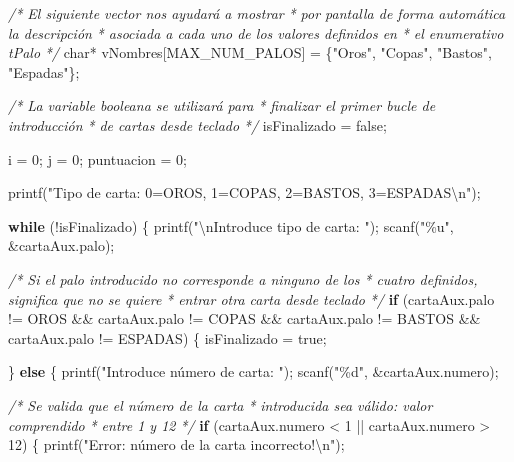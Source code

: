 \documentclass[
]{book}
\newenvironment{Shaded}{\begin{snugshade}}{\end{snugshade}}
\newcommand{\CommentTok}[1]{\textcolor[rgb]{0.56,0.35,0.01}{\textit{#1}}}
\newcommand{\ControlFlowTok}[1]{\textcolor[rgb]{0.13,0.29,0.53}{\textbf{#1}}}
\newcommand{\DataTypeTok}[1]{\textcolor[rgb]{0.13,0.29,0.53}{#1}}
\newcommand{\DecValTok}[1]{\textcolor[rgb]{0.00,0.00,0.81}{#1}}
\newcommand{\NormalTok}[1]{#1}
\newcommand{\SpecialCharTok}[1]{\textcolor[rgb]{0.00,0.00,0.00}{#1}}
\newcommand{\StringTok}[1]{\textcolor[rgb]{0.31,0.60,0.02}{#1}}
\begin{document}
\begin{Shaded}
\begin{Highlighting}[]
    \CommentTok{/* El siguiente vector nos ayudará a mostrar}
\CommentTok{     * por pantalla de forma automática la descripción}
\CommentTok{     * asociada a cada uno de los valores definidos en}
\CommentTok{     * el enumerativo tPalo}
\CommentTok{     */}
    \DataTypeTok{char}\NormalTok{* vNombres[MAX\_NUM\_PALOS] = \{}\StringTok{"Oros"}\NormalTok{, }\StringTok{"Copas"}\NormalTok{, }\StringTok{"Bastos"}\NormalTok{, }\StringTok{"Espadas"}\NormalTok{\};}

    \CommentTok{/* La variable booleana se utilizará para}
\CommentTok{     * finalizar el primer bucle de introducción}
\CommentTok{     * de cartas desde teclado}
\CommentTok{     */}
\NormalTok{    isFinalizado = false;}
    
\NormalTok{    i = }\DecValTok{0}\NormalTok{;}
\NormalTok{    j = }\DecValTok{0}\NormalTok{;}
\NormalTok{    puntuacion = }\DecValTok{0}\NormalTok{;}
    
\NormalTok{    printf(}\StringTok{"Tipo de carta: 0=OROS, 1=COPAS, 2=BASTOS, 3=ESPADAS}\SpecialCharTok{\textbackslash{}n}\StringTok{"}\NormalTok{);}

    \ControlFlowTok{while}\NormalTok{ (!isFinalizado) \{}
\NormalTok{        printf(}\StringTok{"}\SpecialCharTok{\textbackslash{}n}\StringTok{Introduce tipo de carta: "}\NormalTok{);}
\NormalTok{        scanf(}\StringTok{"\%u"}\NormalTok{, \&cartaAux.palo);}
        
        \CommentTok{/* Si el palo introducido no corresponde a ninguno de los}
\CommentTok{         * cuatro definidos, significa que no se quiere}
\CommentTok{         * entrar otra carta desde teclado}
\CommentTok{         */}
        \ControlFlowTok{if}\NormalTok{ (cartaAux.palo != OROS \&\& cartaAux.palo != COPAS}
\NormalTok{            \&\& cartaAux.palo != BASTOS \&\& cartaAux.palo != ESPADAS) \{}
\NormalTok{            isFinalizado = true;}

\NormalTok{        \} }\ControlFlowTok{else}\NormalTok{ \{}
\NormalTok{            printf(}\StringTok{"Introduce número de carta: "}\NormalTok{);}
\NormalTok{            scanf(}\StringTok{"\%d"}\NormalTok{, \&cartaAux.numero);}
            
            \CommentTok{/* Se valida que el número de la carta}
\CommentTok{             * introducida sea válido: valor comprendido}
\CommentTok{             * entre 1 y 12}
\CommentTok{             */}
            \ControlFlowTok{if}\NormalTok{ (cartaAux.numero \textless{} }\DecValTok{1}\NormalTok{ || cartaAux.numero \textgreater{} }\DecValTok{12}\NormalTok{) \{}
\NormalTok{                printf(}\StringTok{"Error: número de la carta incorrecto!}\SpecialCharTok{\textbackslash{}n}\StringTok{"}\NormalTok{);}
                

\end{Highlighting}
\end{Shaded}
\end{document}
